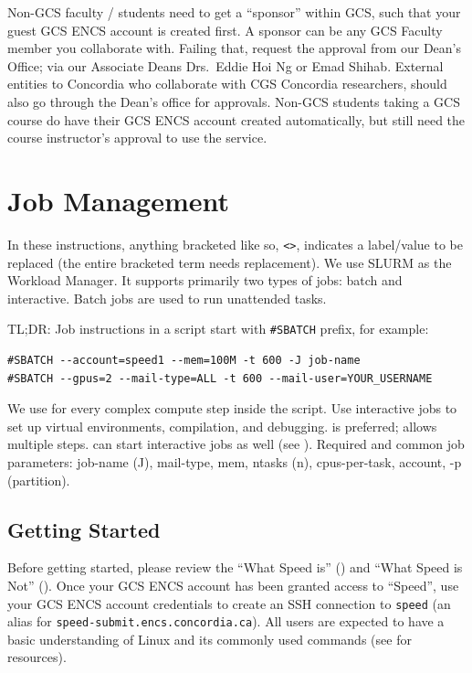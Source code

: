 \documentclass{easychair}
\begin{document}
Non-GCS faculty / students need to get a ``sponsor'' within GCS, such that
your guest GCS ENCS account is created first. A sponsor can be any GCS Faculty member
you collaborate with. Failing that, request the approval from our Dean's Office;
via our Associate Deans Drs.\ Eddie Hoi Ng or Emad Shihab.
%
External entities to Concordia who collaborate with CGS Concordia researchers,
should also go through the Dean's office for approvals.
%
Non-GCS students taking a GCS course do have their GCS ENCS account created automatically,
but still need the course instructor's approval to use the service.

\section{Job Management}
\label{sect:job-management}

In these instructions, anything bracketed like so, \verb+<>+, indicates a
label/value to be replaced (the entire bracketed term needs replacement).
%
We use SLURM as the Workload Manager.
It supports primarily two types of jobs: batch and interactive.
Batch jobs are used to run unattended tasks.

TL;DR:
Job instructions in a script start with \verb+#SBATCH+ prefix, for example:
\begin{verbatim}
#SBATCH --account=speed1 --mem=100M -t 600 -J job-name
#SBATCH --gpus=2 --mail-type=ALL -t 600 --mail-user=YOUR_USERNAME
\end{verbatim}
%
We use  for every complex compute step inside the script.
Use interactive jobs to set up virtual environments, compilation, and debugging.
 is preferred; allows multiple steps.
 can start interactive jobs as well (see ).
Required and common job parameters: job-name (J), mail-type, mem, ntasks (n),
cpus-per-task, account, -p (partition).


\subsection{Getting Started}

Before getting started, please review the ``What Speed is'' ()
and ``What Speed is Not'' ().
Once your GCS ENCS account has been granted access to ``Speed'',
use your GCS ENCS account credentials to create an SSH connection to 
\texttt{speed} (an alias for \texttt{speed-submit.encs.concordia.ca}). 
%
All users are expected to have a basic understanding of
Linux and its commonly used commands (see  for resources).
\end{document}
